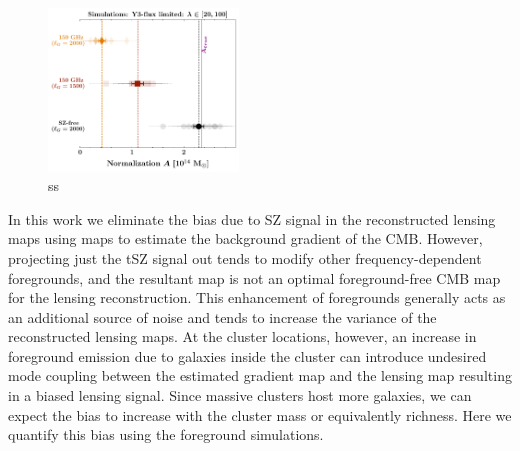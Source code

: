 \begin{figure}
\centering

\includegraphics[width=0.45\textwidth, keepaspectratio]{figs/tsz_bias_checks_sehgal_sims.pdf}
\caption{ss}
\label{fig_QE_sehgal_sims}
\end{figure}

In this work we eliminate the bias due to SZ signal in the reconstructed lensing maps using  maps to estimate the background gradient of the CMB. 
However, projecting just the tSZ signal out tends to modify other frequency-dependent foregrounds, and the resultant map is not an optimal foreground-free CMB map for the lensing reconstruction. 
This enhancement of foregrounds generally acts as an additional source of noise and tends to increase the variance of the reconstructed lensing maps. 
At the cluster locations, however, an increase in foreground emission due to galaxies inside the cluster can introduce undesired mode coupling between the estimated gradient map and the lensing map resulting in a biased lensing signal. 
Since massive clusters host more galaxies, we can expect the bias to increase with the cluster mass or equivalently richness. 
Here we quantify this bias using the  foreground simulations.

